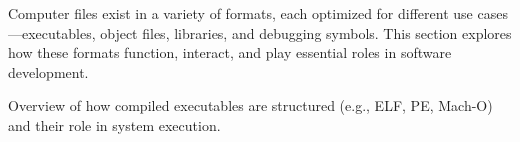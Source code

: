 \begin{NxSBox}
	\begin{NxIDBox}
		Computer files exist in a variety of formats, each optimized for different use cases—executables, object files, libraries, and debugging symbols. This section explores how these formats function, interact, and play essential roles in software development.
	\end{NxIDBox}
	\begin{NxIDBoxL}
		 Overview of how compiled executables are structured (e.g., ELF, PE, Mach-O) and their role in system execution.
	\end{NxIDBoxL}
\end{NxSBox}



%
%
%

